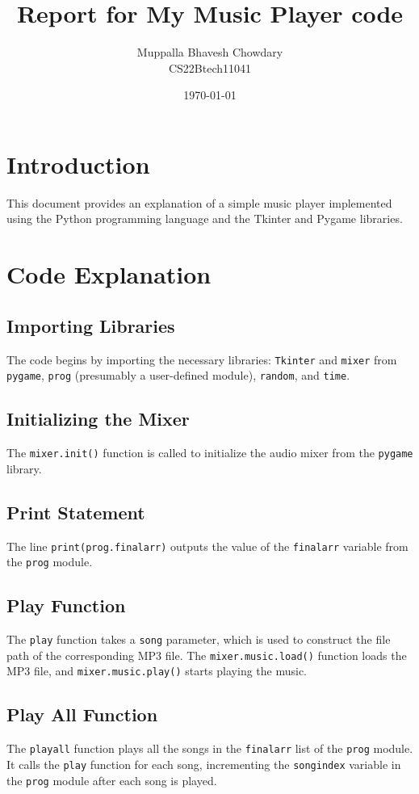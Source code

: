 \documentclass[journal,12pt,twocolumn]{IEEEtran}
\begin{document}
\title{Report for My Music Player code}
\author{Muppalla Bhavesh Chowdary\\
CS22Btech11041
}
\date{\today}
\maketitle

\section{Introduction}
This document provides an explanation of a simple music player implemented using the Python programming language and the Tkinter and Pygame libraries.

\section{Code Explanation}

\subsection{Importing Libraries}
The code begins by importing the necessary libraries: \texttt{Tkinter} and \texttt{mixer} from \texttt{pygame}, \texttt{prog} (presumably a user-defined module), \texttt{random}, and \texttt{time}.

\subsection{Initializing the Mixer}
The \texttt{mixer.init()} function is called to initialize the audio mixer from the \texttt{pygame} library.

\subsection{Print Statement}
The line \texttt{print(prog.finalarr)} outputs the value of the \texttt{finalarr} variable from the \texttt{prog} module.

\subsection{Play Function}
The \texttt{play} function takes a \texttt{song} parameter, which is used to construct the file path of the corresponding MP3 file. The \texttt{mixer.music.load()} function loads the MP3 file, and \texttt{mixer.music.play()} starts playing the music.

\subsection{Play All Function}
The \texttt{playall} function plays all the songs in the \texttt{finalarr} list of the \texttt{prog} module. It calls the \texttt{play} function for each song, incrementing the \texttt{songindex} variable in the \texttt{prog} module after each song is played.
\end{document}
